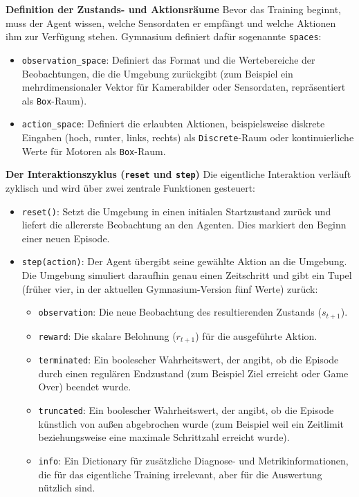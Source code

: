 \documentclass[
  a4paper,
  11pt,
  twoside,
  BCOR=8mm,           %
  headings=big,
  numbers=noenddot,
  listof=totoc,       %
  captions=tableheading,
]{scrreprt}
\begin{document}
\textbf{Definition der Zustands- und Aktionsräume}
Bevor das Training beginnt, muss der Agent wissen, welche Sensordaten er empfängt und welche Aktionen ihm zur Verfügung stehen. Gymnasium definiert dafür sogenannte \texttt{spaces}:
\begin{itemize}
    \item \texttt{observation\_space}: Definiert das Format und die Wertebereiche der Beobachtungen, die die Umgebung zurückgibt (zum Beispiel ein mehrdimensionaler Vektor für Kamerabilder oder Sensordaten, repräsentiert als \texttt{Box}-Raum).
    \item \texttt{action\_space}: Definiert die erlaubten Aktionen, beispielsweise diskrete Eingaben (hoch, runter, links, rechts) als \texttt{Discrete}-Raum oder kontinuierliche Werte für Motoren als \texttt{Box}-Raum.
\end{itemize}

\textbf{Der Interaktionszyklus (\texttt{reset} und \texttt{step})}
Die eigentliche Interaktion verläuft zyklisch und wird über zwei zentrale Funktionen gesteuert:
\begin{itemize}
    \item \texttt{reset()}: Setzt die Umgebung in einen initialen Startzustand zurück und liefert die allererste Beobachtung an den Agenten. Dies markiert den Beginn einer neuen Episode.
    \item \texttt{step(action)}: Der Agent übergibt seine gewählte Aktion an die Umgebung. Die Umgebung simuliert daraufhin genau einen Zeitschritt und gibt ein Tupel (früher vier, in der aktuellen Gymnasium-Version fünf Werte) zurück:
    \begin{itemize}
        \item \texttt{observation}: Die neue Beobachtung des resultierenden Zustands ($s_{t+1}$).
        \item \texttt{reward}: Die skalare Belohnung ($r_{t+1}$) für die ausgeführte Aktion.
        \item \texttt{terminated}: Ein boolescher Wahrheitswert, der angibt, ob die Episode durch einen regulären Endzustand (zum Beispiel Ziel erreicht oder \glqq Game Over\grqq) beendet wurde.
        \item \texttt{truncated}: Ein boolescher Wahrheitswert, der angibt, ob die Episode künstlich von außen abgebrochen wurde (zum Beispiel weil ein Zeitlimit beziehungsweise eine maximale Schrittzahl erreicht wurde).
        \item \texttt{info}: Ein Dictionary für zusätzliche Diagnose- und Metrikinformationen, die für das eigentliche Training irrelevant, aber für die Auswertung nützlich sind.
    \end{itemize}
\end{itemize}
\end{document}
